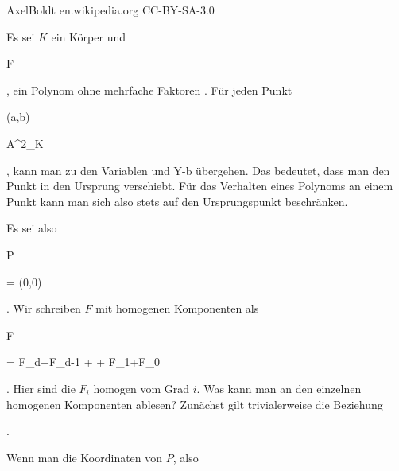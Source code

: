  {AxelBoldt} {} {en.wikipedia.org} {CC-BY-SA-3.0} {}


Es sei $K$ ein Körper und

 {}

 {F } {}

 {} {} {} {,} ein Polynom ohne mehrfache Faktoren
 {} {.}
Für jeden Punkt


\mavergleichskette

{\vergleichskette

{ (a,b)
}

{ \in }{ {\mathbb A}^{2}_{K}
}

{  }{
}

{    }{
}

{   }{
}

}
{}{}{,}
kann man zu den Variablen   {  und  }  { Y-b  }{ } übergehen. Das bedeutet, dass man den Punkt in den Ursprung verschiebt. Für das Verhalten eines Polynoms an einem Punkt kann man sich also stets auf den Ursprungspunkt beschränken.


Es sei also


\mavergleichskette

{\vergleichskette

{ P
}

{ = }{ (0,0)
}

{  }{
}

{    }{
}

{   }{
}

}
{}{}{.}
Wir schreiben $F$ mit homogenen Komponenten als


\mavergleichskettedisp

{\vergleichskette

{ F
}

{ =} { F_d+F_{d-1} + \cdots + F_1+F_0
}

{ } {
}

{ } {
}

{ } {
}

}
{}{}{.}
Hier sind die $F_i$ homogen vom Grad $i$. Was kann man an den einzelnen homogenen Komponenten ablesen? Zunächst gilt trivialerweise die Beziehung


 { . }


Wenn man die Koordinaten von $P$, also


